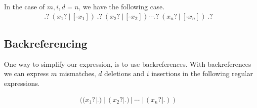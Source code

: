 \documentclass[12pt]{article}
\newcounter{subsubsubsection}[subsubsection]
\begin{document}
In the case of $m, i, d = n$, we have the following case.
\begin{eqnarray}
	.?\ (x_1?\ |\ [\ \hat{}x_1])\ .?\ (x_2?\ |\ [\ \hat{} x_2]) \cdots .?\ (x_n?\ |\ [\ \hat{}x_n])\ .? 
\end{eqnarray}





\subsection{Backreferencing}

One way to simplify our expression, is to use backreferences. With backreferences we can express $m$ mismatches, $d$ deletions and $i$ insertions in the following regular expressions.


\begin{eqnarray}
	((x_1?|.) \ | \ (x_2?|.) \ | \ \cdots \ | \ (x_n?|.))
\end{eqnarray}
\end{document}
